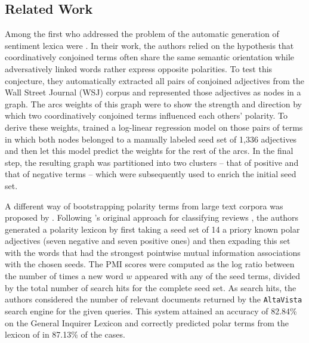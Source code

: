 \subsection{Related Work}

Among the first who addressed the problem of the automatic generation
of sentiment lexica were \citet{Hatzivassi:97}.  In their work, the
authors relied on the hypothesis that coordinatively conjoined terms
often share the same semantic orientation while adversatively linked
words rather express opposite polarities.  To test this conjecture,
they automatically extracted all pairs of conjoined adjectives from
the Wall Street Journal (WSJ) corpus and represented those adjectives
as nodes in a graph.  The arcs weights of this graph were to show the
strength and direction by which two coordinatively conjoined terms
influenced each others' polarity.  To derive these weights,
\citeauthor{Hatzivassi:97} trained a log-linear regression model on
those pairs of terms in which both nodes belonged to a manually
labeled seed set of 1,336 adjectives and then let this model predict
the weights for the rest of the arcs.  In the final step, the
resulting graph was partitioned into two clusters -- that of positive
and that of negative terms -- which were subsequently used to enrich
the initial seed set.

A different way of bootstrapping polarity terms from large text
corpora was proposed by \citet{Turney:03}.  Following
\citeauthor{Turney:02}'s original approach for classifying reviews
\citep{Turney:02}, the authors generated a polarity lexicon by first
taking a seed set of 14 a priory known polar adjectives (seven
negative and seven positive ones) and then expading this set with the
words that had the strongest pointwise mutual information associations
with the chosen seeds.  The PMI scores were computed as the log ratio
between the number of times a new word $w$ appeared with any of the
seed terms, divided by the total number of search hits for the
complete seed set.  As search hits, the authors considered the number
of relevant documents returned by the \texttt{AltaVista} search engine
for the given queries.  This system attained an accuracy of 82.84\% on
the General Inquirer Lexicon \citep{Stone:66} and correctly predicted
polar terms from the lexicon of \cite{Hatzivassi:97} in 87.13\% of the
cases. %

